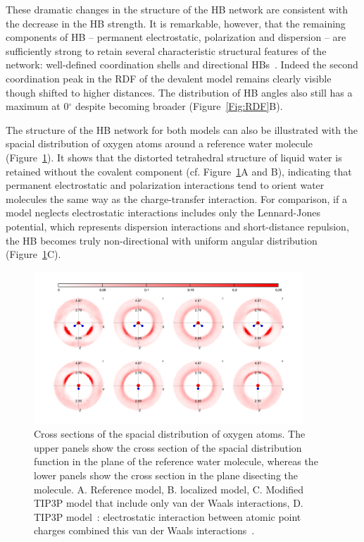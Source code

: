 \documentclass[aps,prl,reprint,amsmath,amssymb]{revtex4-1}
\begin{document}
These dramatic changes in the structure of the HB network are consistent with the decrease in the HB strength. It is remarkable, however, that the remaining components of HB -- permanent electrostatic, polarization and dispersion -- are sufficiently strong to retain several characteristic structural features of the network: well-defined coordination shells and directional HBs~\cite{arunan2011definition}.
%
%
Indeed the second coordination peak in the RDF of the devalent model remains clearly visible though shifted to higher distances. The distribution of HB angles also still has a maximum at 0$^\circ$ despite becoming broader (Figure~\ref{Fig:RDF}B). 

The structure of the HB network for both models can also be illustrated with the spacial distribution of oxygen atoms around a reference water molecule (Figure~\ref{Fig:SDF}). It shows that the distorted tetrahedral structure of liquid water is retained without the covalent component (cf. Figure~\ref{Fig:SDF}A and B), indicating that permanent electrostatic and polarization interactions tend to orient water molecules the same way as the charge-transfer interaction. For comparison, if a model neglects electrostatic interactions includes only the Lennard-Jones potential, which represents dispersion interactions and short-distance repulsion, the HB becomes truly non-directional with uniform angular distribution (Figure~\ref{Fig:SDF}C). 

\begin{figure}
\includegraphics[width=0.9\textwidth]{SDF}
\caption{Cross sections of the spacial distribution of oxygen atoms. The upper panels show the cross section of the spacial distribution function in the plane of the reference water molecule, whereas the lower panels show the cross section in the plane disecting the molecule. A. Reference model, B. localized model, C. Modified TIP3P model that include only van der Waals interactions, D. TIP3P model~\cite{TIP3P}: electrostatic interaction between atomic point charges combined this van der Waals interactions~\cite{TIP3P}.} \label{Fig:SDF}
\end{figure}
\end{document}
